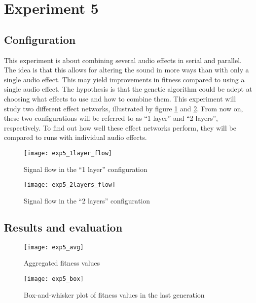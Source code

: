 \section{Experiment 5}

\subsection{Configuration}
This experiment is about combining several audio effects in serial and parallel. The idea is that this allows for altering the sound in more ways than with only a single audio effect. This may yield improvements in fitness compared to using a single audio effect. The hypothesis is that the genetic algorithm could be adept at choosing what effects to use and how to combine them. This experiment will study two different effect networks, illustrated by figure \ref{fig:exp5_1layer_flow} and \ref{fig:exp5_2layers_flow}. From now on, these two configurations will be referred to as ``1 layer'' and ``2 layers'', respectively. To find out how well these effect networks perform, they will be compared to runs with individual audio effects.

\begin{figure}[H]
    \centering
    \texttt{[image: exp5\_1layer\_flow]}
    \caption{Signal flow in the ``1 layer'' configuration}
    \label{fig:exp5_1layer_flow}
\end{figure}

\begin{figure}[H]
    \centering
    \texttt{[image: exp5\_2layers\_flow]}
    \caption{Signal flow in the ``2 layers'' configuration}
    \label{fig:exp5_2layers_flow}
\end{figure}


\subsection{Results and evaluation}

\begin{figure}[H]
    \centering
    \texttt{[image: exp5\_avg]}
    \caption{Aggregated fitness values}
    \label{fig:exp5_avg}
\end{figure}

\begin{figure}[H]
    \centering
    \texttt{[image: exp5\_box]}
    \caption{Box-and-whisker plot of fitness values in the last generation}
    \label{fig:exp5_box}
\end{figure}

